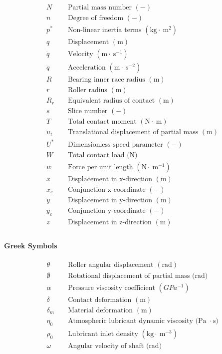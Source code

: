 \begin{align*}
	&N && \text { Partial mass number }(-) \\
	&n && \text { Degree of freedom }(-) \\
	&p^* && \text { Non-linear inertia terms }\left(\mathrm{kg} \cdot \mathrm{~m}^2\right) \\
	&q && \text { Displacement }(\mathrm{m}) \\
	&\ddot{q} && \text { Velocity }\left(\mathrm{m} \cdot \mathrm{~s}^{-1}\right) \\
	&\ddot{q} && \text { Acceleration }\left(\mathrm{m} \cdot \mathrm{~s}^{-2}\right) \\
	&R && \text { Bearing inner race radius }(\mathrm{m}) \\
	&r && \text { Roller radius }(\mathrm{m}) \\
	&R_r && \text { Equivalent radius of contact }(\mathrm{m}) \\
	&s && \text { Slice number }(-) \\
	&T && \text { Total contact moment }(\mathrm{N} \cdot \mathrm{~m}) \\
	&u_t && \text { Translational displacement of partial mass }(\mathrm{m}) \\
	&U^* && \text { Dimensionless speed parameter }(-) \\
	&W && \text { Total contact load (N) } \\
	&w && \text { Force per unit length }\left(\mathrm{N} \cdot \mathrm{~m}^{-1}\right) \\
	&x && \text { Displacement in x-direction }(\mathrm{m}) \\
	&x_c && \text { Conjunction } \mathrm{x} \text {-coordinate }(-) \\
	&y && \text { Displacement in y-direction }(\mathrm{m}) \\
	&y_c && \text { Conjunction y-coordinate }(-) \\
	&z && \text { Displacement in z-direction }(\mathrm{m}) \\
\end{align*}

\paragraph{Greek Symbols}
\begin{align*}
	&\theta && \text { Roller angular displacement }(\mathrm{rad}) \\
	&\emptyset && \text { Rotational displacement of partial mass (rad) } \\
	&\alpha && \text { Pressure viscosity coefficient }\left(GPa^{-1}\right) \\
	&\delta && \text { Contact deformation }(\mathrm{m}) \\
	&\delta_m && \text { Material deformation }(\mathrm{m}) \\
	&\eta_0 && \text { Atmospheric lubricant dynamic viscosity (Pa } \cdot \mathrm{s}) \\
	&\rho_0 && \text { Lubricant inlet density }\left(\mathrm{kg} \cdot \mathrm{~m}^{-3}\right) \\
	&\omega && \text { Angular velocity of shaft (rad) } \\
\end{align*}

